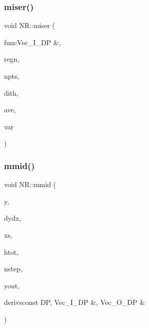 \mbox{\label{namespaceNR_a7633dcff9360f0d1b885d1ea40414046}} 
\subsubsection{\texorpdfstring{miser()}{miser()}}
{\footnotesize\ttfamily void N\+R\+::miser (\begin{DoxyParamCaption}\item[{\mbox{\hyperlink{namespaceNR_af6ff762dd605ff477b8e52387253a02a}{DP}} }]{funcVec\+\_\+\+I\+\_\+\+D\+P \&,  }\item[{\mbox{\hyperlink{namespaceNR_a9f943da53862537c552e2a770cb170ae}{Vec\+\_\+\+I\+\_\+\+DP}} \&}]{regn,  }\item[{const int}]{npts,  }\item[{const \mbox{\hyperlink{namespaceNR_af6ff762dd605ff477b8e52387253a02a}{DP}}}]{dith,  }\item[{\mbox{\hyperlink{namespaceNR_af6ff762dd605ff477b8e52387253a02a}{DP}} \&}]{ave,  }\item[{\mbox{\hyperlink{namespaceNR_af6ff762dd605ff477b8e52387253a02a}{DP}} \&}]{var }\end{DoxyParamCaption})}

\mbox{\label{namespaceNR_afc0314b689ffee95d1fdb24b9fd99e5a}} 
\subsubsection{\texorpdfstring{mmid()}{mmid()}}
{\footnotesize\ttfamily void N\+R\+::mmid (\begin{DoxyParamCaption}\item[{\mbox{\hyperlink{namespaceNR_a9f943da53862537c552e2a770cb170ae}{Vec\+\_\+\+I\+\_\+\+DP}} \&}]{y,  }\item[{\mbox{\hyperlink{namespaceNR_a9f943da53862537c552e2a770cb170ae}{Vec\+\_\+\+I\+\_\+\+DP}} \&}]{dydx,  }\item[{const \mbox{\hyperlink{namespaceNR_af6ff762dd605ff477b8e52387253a02a}{DP}}}]{xs,  }\item[{const \mbox{\hyperlink{namespaceNR_af6ff762dd605ff477b8e52387253a02a}{DP}}}]{htot,  }\item[{const int}]{nstep,  }\item[{\mbox{\hyperlink{namespaceNR_a970094d23441f8ef6a45282a7eb2103d}{Vec\+\_\+\+O\+\_\+\+DP}} \&}]{yout,  }\item[{void }]{derivsconst D\+P, Vec\+\_\+\+I\+\_\+\+D\+P \&, Vec\+\_\+\+O\+\_\+\+D\+P \& }\end{DoxyParamCaption})}

